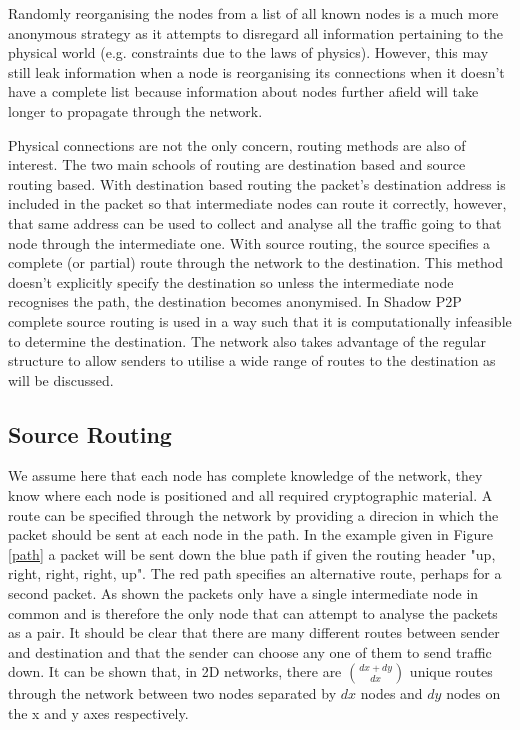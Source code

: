 \documentclass[ %
                    author={Luke Murray},
                supervisor={Dr. Simon Hollis},
                     title={Shadow Peer-to-Peer Networks},
                  subtitle={},
                    degree={MEng},
                      year={2013} ]{thesis}
\begin{document}
Randomly reorganising the nodes from a list of all known nodes is a much more anonymous strategy as it attempts to disregard all information pertaining to the physical world (e.g. constraints due to the laws of physics). However, this may still leak information when a node is reorganising its connections when it doesn't have a complete list because information about nodes further afield will take longer to propagate through the network.

Physical connections are not the only concern, routing methods are also of interest. The two main schools of routing are destination based and source routing based. With destination based routing the packet's destination address is included in the packet so that intermediate nodes can route it correctly, however, that same address can be used to collect and analyse all the traffic going to that node through the intermediate one. With source routing, the source specifies a complete (or partial) route through the network to the destination. This method doesn't explicitly specify the destination so unless the intermediate node recognises the path, the destination becomes anonymised. In Shadow P2P complete source routing is used in a way such that it is computationally infeasible to determine the destination. The network also takes advantage of the regular structure to allow senders to utilise a wide range of routes to the destination as will be discussed.

\subsection{Source Routing}

We assume here that each node has complete knowledge of the network, they know where each node is positioned and all required cryptographic material. A route can be specified through the network by providing a direcion in which the packet should be sent at each node in the path. In the example given in Figure \ref{path} a packet will be sent down the blue path if given the routing header "up, right, right, right, up". The red path specifies an alternative route, perhaps for a second packet. As shown the packets only have a single intermediate node in common and is therefore the only node that can attempt to analyse the packets as a pair. It should be clear that there are many different routes between sender and destination and that the sender can choose any one of them to send traffic down. It can be shown that, in 2D networks, there are ${dx + dy \choose dx}$ unique routes through the network between two nodes separated by $dx$ nodes and $dy$ nodes on the x and y axes respectively.
\end{document}
